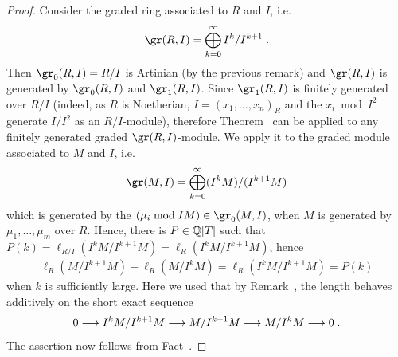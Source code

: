 \documentclass[a4paper,parskip=half,numbers=enddot, DIV=12]{scrreprt}
\begin{document}
\begin{proof}
    Consider the graded ring associated to $R$ and $I$, i.e.
    \begin{align*}
    	\gr(R,I) = \bigoplus_{k=0}^\infty I^k/I^{k+1}\;. 
    \end{align*}
    Then $\gr_0(R,I) = R/I$ is Artinian (by the previous remark) and $\gr(R,I)$ is generated by $\gr_0(R,I)$ and $\gr_1(R,I)$. Since $\gr_1(R,I)$ is finitely generated over $R/I$ (indeed, as $R$ is Noetherian, $I =  (x_1,\ldots, x_n)_R$ and the $x_i\bmod I^2$ generate $I/I^2$ as an $R/I$-module), therefore Theorem~ can be applied to any finitely generated graded $\gr(R,I)$-module. We apply it to the graded module associated to $M$ and $I$, i.e.
    \begin{align*}
    	\gr(M,I) = \bigoplus_{k=0}^\infty (I^kM)/(I^{k+1}M)
    \end{align*}	
   	which is generated by the $(\mu_i \bmod IM)\in \gr_0(M,I)$, when $M$ is generated by $\mu_1,\ldots,\mu_m$ over $R$. Hence, there is $P\in \mathbb{Q}[T]$ such that $P(k) = \ell_{R/I} (I^kM/I^{k+1}M) = \ell_R(I^kM/I^{k+1}M)$, hence
    \begin{align*}
        \ell_R(M/I^{k+1}M) - \ell_R(M/I^kM) = \ell_R(I^kM/I^{k+1}M) = P(k)
    \end{align*}
    when $k$ is sufficiently large. Here we used that by Remark~, the length behaves additively on the short exact sequence
    \begin{align*}
    	0\morphism I^kM/I^{k+1} M \morphism M/I^{k+1}M \morphism M/I^kM\morphism 0\;.
    \end{align*}
    The assertion now follows from Fact~.
\end{proof}
\end{document}
